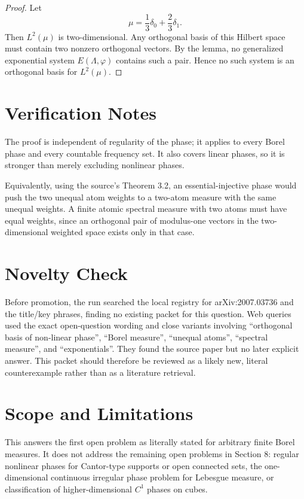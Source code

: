 \documentclass[11pt]{article}
\begin{document}
\begin{proof}
Let
\[
\mu=\frac13\delta_0+\frac23\delta_1.
\]
Then $L^2(\mu)$ is two-dimensional. Any orthogonal basis of this Hilbert space
must contain two nonzero orthogonal vectors. By the lemma, no generalized
exponential system $E(\Lambda,\varphi)$ contains such a pair. Hence no such
system is an orthogonal basis for $L^2(\mu)$.
\end{proof}

\section{Verification Notes}

The proof is independent of regularity of the phase; it applies to every Borel
phase and every countable frequency set. It also covers linear phases, so it
is stronger than merely excluding nonlinear phases.

Equivalently, using the source's Theorem 3.2, an essential-injective phase
would push the two unequal atom weights to a two-atom measure with the same
unequal weights. A finite atomic spectral measure with two atoms must have
equal weights, since an orthogonal pair of modulus-one vectors in the
two-dimensional weighted space exists only in that case.

\section{Novelty Check}

Before promotion, the run searched the local registry for arXiv:2007.03736 and
the title/key phrases, finding no existing packet for this question. Web
queries used the exact open-question wording and close variants involving
``orthogonal basis of non-linear phase'', ``Borel measure'', ``unequal
atoms'', ``spectral measure'', and ``exponentials''. They found the source
paper but no later explicit answer. This packet should therefore be reviewed
as a likely new, literal counterexample rather than as a literature retrieval.

\section{Scope and Limitations}

This answers the first open problem as literally stated for arbitrary finite
Borel measures. It does not address the remaining open problems in Section 8:
regular nonlinear phases for Cantor-type supports or open connected sets, the
one-dimensional continuous irregular phase problem for Lebesgue measure, or
classification of higher-dimensional $C^1$ phases on cubes.
\end{document}
